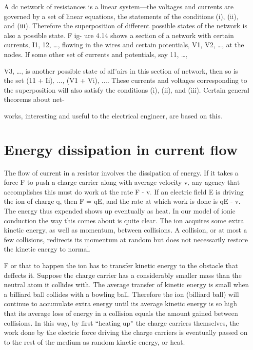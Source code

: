 A dc network of resistances is a linear system---the voltages and
currents are governed by a set of linear equations, the statements of
the conditions (i), (ii), and (iii). Therefore the superposition of
different possible states of the network is also a possible state. F ig-
ure 4.14 shows a section of a network with certain currents, I1,
12, \ldots , flowing in the wires and certain potentials, V1, V2, \ldots , at
the nodes. If some other set of currents and potentials, say 11, \ldots ,

V3, \ldots , is another possible state of aff'airs in this section of network,
then so is the set (11 + Ii), ..., (V1 + Vi), .... These currents
and voltages corresponding to the superposition will also satisfy the
conditions (i), (ii), and (iii). Certain general theorems about net-

works, interesting and useful to the electrical engineer, are based
on this.

\section{Energy dissipation in current flow}

The flow of current in a resistor involves the dissipation of energy.
If it takes a force F to push a charge carrier along with average
velocity v, any agency that accomplishes this must do work at the
rate F - v. If an electric field E is driving the ion of charge q, then
F = qE, and the rate at which work is done is qE - v. The energy
thus expended shows up eventually as heat. In our model of ionic
conduction the way this comes about is quite clear. The ion acquires
some extra kinetic energy, as well as momentum, between collisions.
A collision, or at most a few collisions, redirects its momentum at
random but does not necessarily restore the kinetic energy to normal.

F or that to happen the ion has to transfer kinetic energy to the obstacle
that deffects it. Suppose the charge carrier has a considerably
smaller mass than the neutral atom it collides with. The average
transfer of kinetic energy is small when a billiard ball collides with
a bowling ball. Therefore the ion (billiard ball) will continue to
accumulate extra energy until its average kinetic energy is so high
that its average loss of energy in a collision equals the amount gained
between collisions. In this way, by first ``heating up'' the charge
carriers themselves, the work done by the electric force driving the
charge carriers is eventually passed on to the rest of the medium as
random kinetic energy, or heat.

